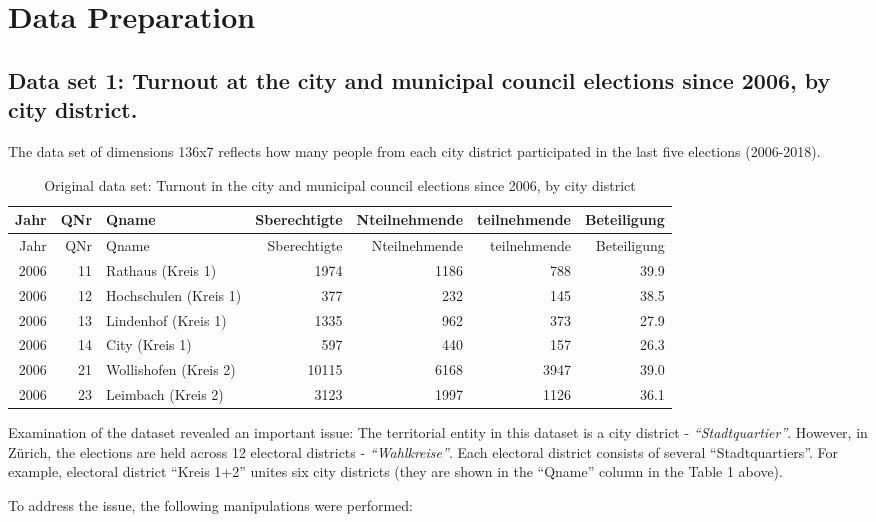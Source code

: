 \documentclass[
]{article}
\begin{document}
\pagebreak

\hypertarget{data-preparation}{%
\section{Data Preparation}\label{data-preparation}}

\hypertarget{data-set-1-turnout-at-the-city-and-municipal-council-elections-since-2006-by-city-district.}{%
\subsection{Data set 1: Turnout at the city and municipal council
elections since 2006, by city
district.}\label{data-set-1-turnout-at-the-city-and-municipal-council-elections-since-2006-by-city-district.}}

The data set of dimensions 136x7 reflects how many people from each city
district participated in the last five elections (2006-2018).

\begin{longtable}[]{@{}rrlrrrr@{}}
\caption{Original data set: Turnout in the city and municipal council
elections since 2006, by city district}\tabularnewline
\toprule
Jahr & QNr & Qname & Sberechtigte & Nteilnehmende & teilnehmende &
Beteiligung\tabularnewline
\midrule
\endfirsthead
\toprule
Jahr & QNr & Qname & Sberechtigte & Nteilnehmende & teilnehmende &
Beteiligung\tabularnewline
\midrule
\endhead
2006 & 11 & Rathaus (Kreis 1) & 1974 & 1186 & 788 & 39.9\tabularnewline
2006 & 12 & Hochschulen (Kreis 1) & 377 & 232 & 145 &
38.5\tabularnewline
2006 & 13 & Lindenhof (Kreis 1) & 1335 & 962 & 373 & 27.9\tabularnewline
2006 & 14 & City (Kreis 1) & 597 & 440 & 157 & 26.3\tabularnewline
2006 & 21 & Wollishofen (Kreis 2) & 10115 & 6168 & 3947 &
39.0\tabularnewline
2006 & 23 & Leimbach (Kreis 2) & 3123 & 1997 & 1126 &
36.1\tabularnewline
\bottomrule
\end{longtable}

Examination of the dataset revealed an important issue: The territorial
entity in this dataset is a city district - \emph{``Stadtquartier''}.
However, in Zürich, the elections are held across 12 electoral districts
- \emph{``Wahlkreise''}. Each electoral district consists of several
``Stadtquartiers''. For example, electoral district ``Kreis 1+2'' unites
six city districts (they are shown in the ``Qname'' column in the Table
1 above).

To address the issue, the following manipulations were performed:
\end{document}
